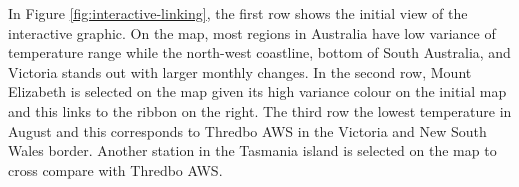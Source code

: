 \documentclass[
]{jss}
\newenvironment{Shaded}{\begin{snugshade}}{\end{snugshade}}
\newcommand{\AttributeTok}[1]{\textcolor[rgb]{0.77,0.63,0.00}{#1}}
\newcommand{\CommentTok}[1]{\textcolor[rgb]{0.56,0.35,0.01}{\textit{#1}}}
\newcommand{\FunctionTok}[1]{\textcolor[rgb]{0.00,0.00,0.00}{#1}}
\newcommand{\NormalTok}[1]{#1}
\newcommand{\OtherTok}[1]{\textcolor[rgb]{0.56,0.35,0.01}{#1}}
\newcommand{\SpecialCharTok}[1]{\textcolor[rgb]{0.00,0.00,0.00}{#1}}
\newcommand{\StringTok}[1]{\textcolor[rgb]{0.31,0.60,0.02}{#1}}
\begin{document}
\begin{Shaded}
\end{Shaded}

In Figure \ref{fig:interactive-linking}, the first row shows the initial view of the interactive graphic. On the map, most regions in Australia have low variance of temperature range while the north-west coastline, bottom of South Australia, and Victoria stands out with larger monthly changes. In the second row, Mount Elizabeth is selected on the map given its high variance colour on the initial map and this links to the ribbon on the right. The third row the lowest temperature in August and this corresponds to Thredbo AWS in the Victoria and New South Wales border. Another station in the Tasmania island is selected on the map to cross compare with Thredbo AWS.
\end{document}
